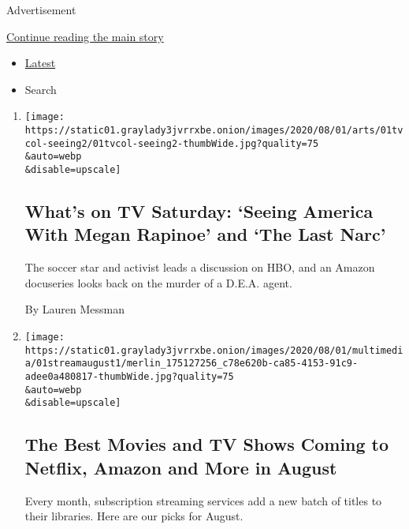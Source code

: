 Advertisement

\protect\hyperlink{after-mid1}{Continue reading the main story}

\begin{itemize}
\tightlist
\item
  \protect\hyperlink{stream-panel}{Latest}
\item
  Search
\end{itemize}

\begin{enumerate}
\def\labelenumi{\arabic{enumi}.}
\item
  \href{/2020/08/01/arts/television/whats-on-tv-saturday-seeing-america-with-megan-rapinoe-and-the-last-narc.html}{}

  \texttt{[image: https://static01.graylady3jvrrxbe.onion/images/2020/08/01/arts/01tvcol-seeing2/01tvcol-seeing2-thumbWide.jpg?quality=75\\\&auto=webp\\\&disable=upscale]}

  \hypertarget{whats-on-tv-saturday-seeing-america-with-megan-rapinoe-and-the-last-narc}{%
  \subsection{What's on TV Saturday: `Seeing America With Megan Rapinoe'
  and `The Last
  Narc'}\label{whats-on-tv-saturday-seeing-america-with-megan-rapinoe-and-the-last-narc}}

  The soccer star and activist leads a discussion on HBO, and an Amazon
  docuseries looks back on the murder of a D.E.A. agent.

  By Lauren Messman
\item
  \href{/2020/07/31/arts/television/new-to-stream-netflix.html}{}

  \texttt{[image: https://static01.graylady3jvrrxbe.onion/images/2020/08/01/multimedia/01streamaugust1/merlin\_175127256\_c78e620b-ca85-4153-91c9-adee0a480817-thumbWide.jpg?quality=75\\\&auto=webp\\\&disable=upscale]}

  \hypertarget{the-best-movies-and-tv-shows-coming-to-netflix-amazon-and-more-in-august}{%
  \subsection{The Best Movies and TV Shows Coming to Netflix, Amazon and
  More in
  August}\label{the-best-movies-and-tv-shows-coming-to-netflix-amazon-and-more-in-august}}

  Every month, subscription streaming services add a new batch of titles
  to their libraries. Here are our picks for August.


\end{enumerate}
